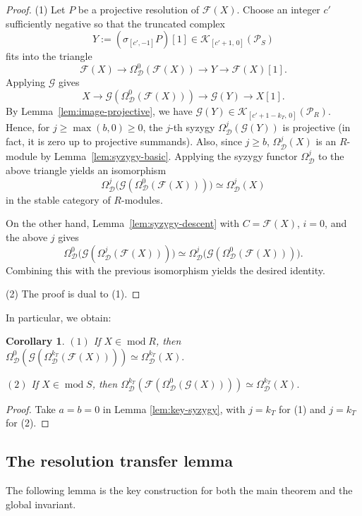\documentclass[12pt,a4paper,reqno]{amsart}
\theoremstyle{plain}
\newtheorem{corollary}[theorem]{Corollary}
\theoremstyle{definition}
\theoremstyle{remark}
\DeclareMathOperator{\modd}{mod}
\newcommand{\syz}{\Omega_{\mathcal{D}}}
\begin{document}
\begin{proof}
(1) Let $P$ be a projective resolution of $\mathcal F(X)$. Choose an integer $c'$ sufficiently negative so that the truncated complex
\[
Y := (\sigma_{[c',-1]}P)[1]\in \mathcal K_{[c'+1,\,0]}(\mathcal P_S)
\]
fits into the triangle
\[
\mathcal F(X) \longrightarrow \syz^0(\mathcal F(X)) \longrightarrow Y \longrightarrow \mathcal F(X)[1].
\]
Applying $\mathcal G$ gives
\[
X \longrightarrow \mathcal G(\syz^0(\mathcal F(X))) \longrightarrow \mathcal G(Y) \longrightarrow X[1].
\]
By Lemma~\ref{lem:image-projective}, we have $\mathcal G(Y)\in \mathcal K_{[c'+1-k_T,\,0]}(\mathcal P_R)$. Hence, for $j \ge \max(b,0)\ge 0$, the $j$-th syzygy $\syz^j(\mathcal G(Y))$ is projective (in fact, it is zero up to projective summands). Also, since $j\ge b$, $\syz^j(X)$ is an $R$-module by Lemma~\ref{lem:syzygy-basic}. Applying the syzygy functor $\syz^j$ to the above triangle yields an isomorphism
\[
\syz^j\bigl(\mathcal G(\syz^0(\mathcal F(X)))\bigr) \simeq \syz^j(X)
\]
in the stable category of $R$-modules.

On the other hand, Lemma~\ref{lem:syzygy-descent} with $C=\mathcal F(X)$, $i=0$, and the above $j$ gives
\[
\syz^{0}\bigl(\mathcal G(\syz^{j}(\mathcal F(X)))\bigr)
\simeq
\syz^{j}\bigl(\mathcal G(\syz^0(\mathcal F(X)))\bigr).
\]
Combining this with the previous isomorphism yields the desired identity.

(2) The proof is dual to (1).
\end{proof}

In particular, we obtain:

\begin{corollary}\label{cor:key-syzygy}
$(1)$ If $X \in \modd R$, then
\(
\syz^{0}(\mathcal{G}(\syz^{k_T}(\mathcal{F}(X)))) \simeq \syz^{k_T}(X).
\)

$(2)$ If $X \in \modd S$, then
\(
\syz^{k_T}(\mathcal{F}(\syz^{0}(\mathcal{G}(X)))) \simeq \syz^{k_T}(X).
\)
\end{corollary}

\begin{proof}
Take $a=b=0$ in Lemma \ref{lem:key-syzygy}, with $j=k_T$ for (1) and $j=k_T$ for (2).
\end{proof}

\subsection{The resolution transfer lemma}

The following lemma is the key construction for both the main theorem and the global invariant.
\end{document}
